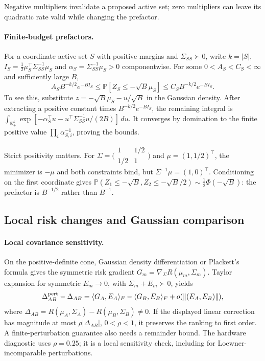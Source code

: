 \documentclass[a4paper,onecolumn,unpublished,nopdfoutputerror]{quantumarticle}
\theoremstyle{plain}
\theoremstyle{definition}
\newcommand{\Prob}{\mathbb{P}}
\newcommand{\R}{\mathbb{R}}
\newcommand{\1}{\mathbf{1}}
\begin{document}
Negative multipliers invalidate a proposed active set; zero multipliers can leave its quadratic rate valid while changing the prefactor.

\paragraph{Finite-budget prefactors.}
For a coordinate active set $S$ with positive margins and $\Sigma_{SS}\succ0$, write $k=|S|$, $I_S=\tfrac12\mu_S^\top\Sigma_{SS}^{-1}\mu_S$ and $\alpha_S=\Sigma_{SS}^{-1}\mu_S>0$ componentwise. For some $0<A_S<C_S<\infty$ and sufficiently large $B$,
\begin{equation}\label{eq:regular_face_prefactor}
A_SB^{-k/2}e^{-BI_S}\le\Prob[Z_S\le-\sqrt B\mu_S]
\le C_SB^{-k/2}e^{-BI_S}.
\end{equation}
To see this, substitute $z=-\sqrt B\mu_S-u/\sqrt B$ in the Gaussian density. After extracting a positive constant times $B^{-k/2}e^{-BI_S}$, the remaining integral is $\int_{\R_+^k}\exp[-\alpha_S^\top u-u^\top\Sigma_{SS}^{-1}u/(2B)]\,du$. It converges by domination to the finite positive value $\prod_i\alpha_{S,i}^{-1}$, proving the bounds.

Strict positivity matters. For $\Sigma=\bigl(\begin{smallmatrix}1&1/2\\1/2&1\end{smallmatrix}\bigr)$ and $\mu=(1,1/2)^\top$, the minimizer is $-\mu$ and both constraints bind, but $\Sigma^{-1}\mu=(1,0)^\top$. Conditioning on the first coordinate gives $\Prob(Z_1\le-\sqrt B,Z_2\le-\sqrt B/2)\sim\tfrac12\Phi(-\sqrt B)$: the prefactor is $B^{-1/2}$ rather than $B^{-1}$.

\subsection{Local risk changes and Gaussian comparison}
\label{app:gaussian_comparison}\label{app:slepian_safe}

\paragraph{Local covariance sensitivity.}
On the positive-definite cone, Gaussian density differentiation or Plackett's formula \cite{Plackett1954} gives the symmetric risk gradient $G_m=\nabla_\Sigma R(\mu_m,\Sigma_m)$. Taylor expansion for symmetric $E_m\to0$, with $\Sigma_m+E_m\succ0$, yields
\begin{equation}\label{eq:local_risk_change}
\Delta_{AB}^{\rm pert}-\Delta_{AB}
=\langle G_A,E_A\rangle_F-\langle G_B,E_B\rangle_F
+o(\|(E_A,E_B)\|),
\end{equation}
where $\Delta_{AB}=R(\mu_A,\Sigma_A)-R(\mu_B,\Sigma_B)\ne0$. If the displayed linear correction has magnitude at most $\rho|\Delta_{AB}|$, $0<\rho<1$, it preserves the ranking to first order. A finite-perturbation guarantee also needs a remainder bound. The hardware diagnostic uses $\rho=0.25$; it is a local sensitivity check, including for Loewner-incomparable perturbations.
\end{document}
